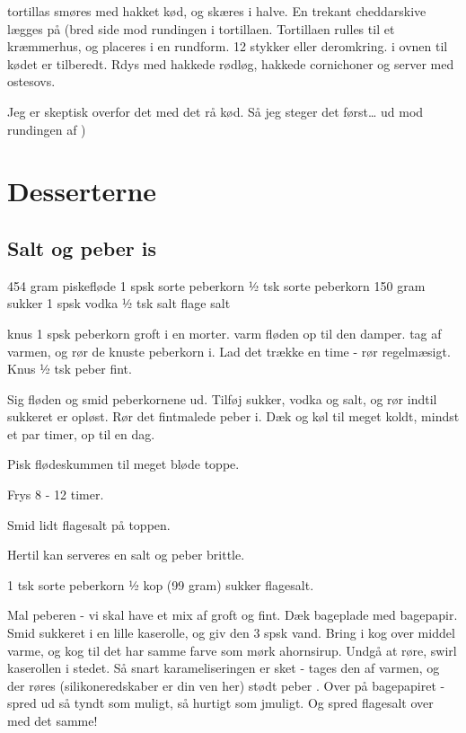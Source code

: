 \documentclass[
]{book}
\begin{document}
tortillas smøres med hakket kød, og skæres i halve.
En trekant cheddarskive lægges på (bred side mod rundingen i tortillaen.
Tortillaen rulles til et kræmmerhus, og placeres i en rundform. 12 stykker eller
deromkring. i ovnen til kødet er tilberedt. Rdys med hakkede rødløg, hakkede
cornichoner og server med ostesovs.

Jeg er skeptisk overfor det med det rå kød. Så jeg steger det først\ldots{}
ud mod rundingen af )

\hypertarget{desserterne}{%
\chapter{Desserterne}\label{desserterne}}

\hypertarget{salt-og-peber-is}{%
\section{Salt og peber is}\label{salt-og-peber-is}}

454 gram piskefløde
1 spsk sorte peberkorn
½ tsk sorte peberkorn
150 gram sukker
1 spsk vodka
½ tsk salt
flage salt

knus 1 spsk peberkorn groft i en morter.
varm fløden op til den damper. tag af varmen, og rør de
knuste peberkorn i. Lad det trække en time - rør regelmæsigt.
Knus ½ tsk peber fint.

Sig fløden og smid peberkornene ud. Tilføj sukker,
vodka og salt, og rør indtil sukkeret er opløst.
Rør det fintmalede peber i. Dæk og køl til meget
koldt, mindst et par timer, op til en dag.

Pisk flødeskummen til meget bløde toppe.

Frys 8 - 12 timer.

Smid lidt flagesalt på toppen.

Hertil kan serveres en salt og peber brittle.

1 tsk sorte peberkorn
½ kop (99 gram) sukker
flagesalt.

Mal peberen - vi skal have et mix af groft og fint.
Dæk bageplade med bagepapir.
Smid sukkeret i en lille kaserolle, og giv den 3
spsk vand. Bring i kog over middel varme,
og kog til det har samme farve som mørk ahornsirup.
Undgå at røre, swirl kaserollen i stedet.
Så snart karameliseringen er sket - tages den af varmen, og der røres (silikoneredskaber er din ven her) stødt peber . Over på bagepapiret - spred ud så tyndt som muligt, så hurtigt som jmuligt. Og spred
flagesalt over med det samme!
\end{document}
